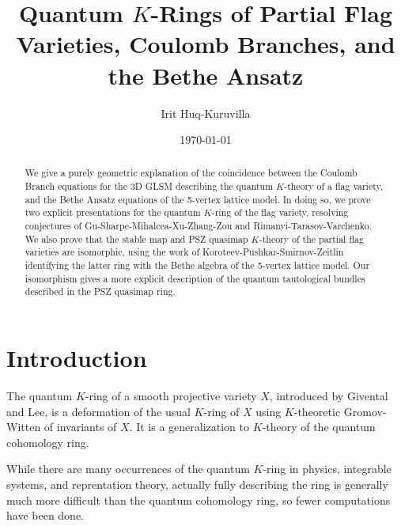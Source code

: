\documentclass[11pt,letterpaper]{amsart}
\begin{document}
\title{Quantum $K$-Rings of Partial Flag Varieties, Coulomb Branches, and the Bethe Ansatz}
\author{Irit Huq-Kuruvilla}
\address{Department of Mathematics\\
Virginia Tech\\
Blacksburg, VA 24060}
\date{\today}

\theoremstyle{definition}
\newtheorem{mydef}{Definition}[section]
\newtheorem{ex}{Example}[section]
\theoremstyle{plain}
\newtheorem{thm}{Theorem}[section]

\newtheorem*{thm*}{Theorem}
\newtheorem{lem}[thm]{Lemma}
\newtheorem{conj}{Conjecture}[section]
\newtheorem{prop}[thm]{Proposition}
\newtheorem{cor}[thm]{Corollary}
\newtheorem{exercise}[thm]{Exercise}
\newtheorem{remark}[thm]{Remark}
\begin{abstract}
We give a purely geometric explanation of the coincidence between the Coulomb Branch equations for the 3D GLSM describing the quantum $K$-theory of a flag variety, and the Bethe Ansatz equations of the 5-vertex lattice model. In doing so, we prove two explicit presentations for the quantum $K$-ring of the flag variety, resolving  conjectures of Gu-Sharpe-Mihalcea-Xu-Zhang-Zou and Rimanyi-Tarasov-Varchenko. We also prove that the stable map and PSZ quasimap $K$-theory of the partial flag varieties are isomorphic, using the work of Koroteev-Pushkar-Smirnov-Zeitlin identifying the latter ring with the Bethe algebra of the 5-vertex lattice model. Our isomorphism gives a more explicit description of the quantum tautological bundles described in the PSZ quasimap ring.

    
\end{abstract}
\maketitle
\section{Introduction}
The quantum $K$-ring of a smooth projective variety $X$, introduced by Givental and Lee, is a deformation of the usual $K$-ring of $X$ using $K$-theoretic Gromov-Witten of invariants of $X$. It is a generalization to $K$-theory of the quantum cohomology ring.

While there are many occurrences of the quantum $K$-ring in physics, integrable systems, and reprentation theory, actually fully describing the ring is generally much more difficult than the quantum cohomology ring, so fewer computations have been done. 
\end{document}
